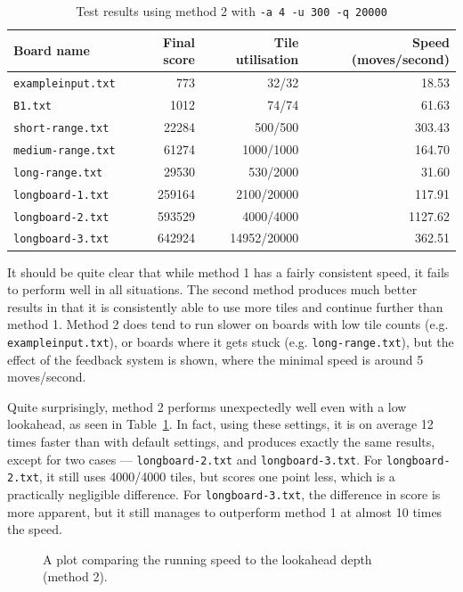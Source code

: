 \documentclass[a4paper, 11pt, titlepage]{report}
\begin{document}
\begin{table}[H]
  \centering
  \caption{Test results using method 2 with \texttt{-a 4 -u 300 -q 20000}}
    \begin{tabular}{lrrr}
    \hline
    Board name & Final score & Tile utilisation & Speed (moves/second) \\
    \hline
    \texttt{exampleinput.txt} &   773    &   32/32    & 18.53  \\
    \texttt{B1.txt} &   1012    &  74/74     &  61.63 \\
    \texttt{short-range.txt} & 22284 & 500/500 & 303.43 \\
    \texttt{medium-range.txt} & 61274 & 1000/1000 & 164.70 \\
    \texttt{long-range.txt} & 29530 & 530/2000 & 31.60 \\
    \texttt{longboard-1.txt} & 259164 & 2100/20000 & 117.91 \\
    \texttt{longboard-2.txt} & 593529 & 4000/4000 & 1127.62 \\
    \texttt{longboard-3.txt} & 642924 & 14952/20000 & 362.51 \\
    \hline
    \end{tabular}%
  \label{tab:results-method2-modded}%
\end{table}%

It should be quite clear that while method 1 has a fairly consistent speed, it fails to perform well in all situations. The second method produces much better results in that it is consistently able to use more tiles and continue further than method 1. Method 2 does tend to run slower on boards with low tile counts (e.g. \texttt{exampleinput.txt}), or boards where it gets stuck (e.g. \texttt{long-range.txt}), but the effect of the feedback system is shown, where the minimal speed is around 5 moves/second.

Quite surprisingly, method 2 performs unexpectedly well even with a low lookahead, as seen in Table~\ref{tab:results-method2-modded}. In fact, using these settings, it is on average 12 times faster than with default settings, and produces exactly the same results, except for two cases --- \texttt{longboard-2.txt} and \texttt{longboard-3.txt}. For \texttt{longboard-2.txt}, it still uses 4000/4000 tiles, but scores one point less, which is a practically negligible difference. For \texttt{longboard-3.txt}, the difference in score is more apparent, but it still manages to outperform method 1 at almost 10 times the speed.

\begin{figure}[H]
	\centering
	\caption{A plot comparing the running speed to the lookahead depth (method 2).}
	\label{fig:lookahead_speed}
\end{figure}
\end{document}
